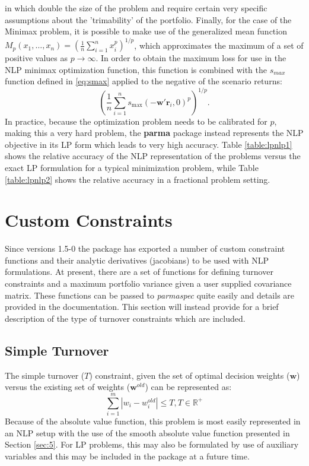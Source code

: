 in \citet{Jacobs2006} which double the size of the problem and require
certain very specific assumptions about the 'trimability' of the portfolio.
Finally, for the case of the Minimax problem, it is possible to make use of
the generalized mean function ${M_p}\left( {{x_1},\dots,{x_n}} \right)={\left(
{\frac{1}{n}\sum\limits_{i=1}^n {x_i^p} } \right)^{1/p}}$, which
approximates the maximum of a set of positive values as $p \to  \infty$. In
order to obtain the maximum loss for use in the NLP minimax optimization
function, this function is combined with the $s_{max}$ function defined in
\eqref{eq:smax} applied to the negative of the scenario returns:
\begin{equation}\label{eq:sminimax}
{\left( {\frac{1}{n}\sum\limits_{i=1}^n {{s_{\max }}{{\left( { - {\mathbf{w}}'{\mathbf{r}_i},0} \right)}^p}} } \right)^{1/p}}.
\end{equation}
In practice, because the optimization problem needs to be calibrated for $p$,
making this a very hard problem, the \textbf{parma} package instead represents
the NLP objective in its LP form which leads to very high accuracy.
Table \ref{table:lpnlp1} shows the relative accuracy of the NLP representation of the
problems versus the exact LP formulation for a typical minimization problem, while
Table \ref{table:lpnlp2} shows the relative accuracy in a fractional problem setting.


\section{Custom Constraints}\label{sec:6}
Since versions 1.5-0 the package has exported a number of custom constraint functions and their analytic derivatives (jacobians) to be used with NLP formulations. At present,
there are a set of functions for defining turnover constraints and a maximum portfolio variance given a user supplied covariance matrix. These functions can be passed to \emph{parmaspec} quite easily and details are provided in the documentation. This section will instead provide for a brief description of the type of turnover constraints which are included.
\subsection{Simple Turnover}
The simple turnover ($T$) constraint, given the set of optimal decision weights ($\mathbf{w}$) versus the existing set of weights ($\mathbf{w}^{old}$) can be represented as:
\begin{equation}
\sum\limits_{i = 1}^m {\left| {{w_i} - w_i^{old}} \right| \leqslant T,T \in {\mathbb{R}^ + }}
\end{equation}
Because of the absolute value function, this problem is most easily represented in an NLP setup with the use of the smooth absolute value function presented in Section \ref{sec:5}. For LP problems, this may also be formulated by use of auxiliary variables and this may be included in the package at a future time.
